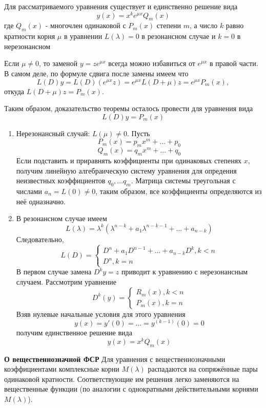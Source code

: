 \begin{theorem}
Для рассматриваемого уравнения существует и единственно решение вида
\[y(x) = x^k e^{\mu x} Q_m(x) \]
где $ Q_m(x)$ - многочлен одинаковой с $P_m(x)$ степени $m$, а число $k$ равно кратности корня $\mu$ в уравнении $L(\lambda)=0$ в резонансном случае и $k=0$ в нерезонансном
\end{theorem}

\Proof
Если $\mu \neq 0$, то заменой $y = z e^{\mu x}$ всегда можно избавиться от $e^{\mu x}$ в правой части. В самом деле, по формуле сдвига после замены имеем что \[L(D) y = L(D)(e^{\mu x} z) = e^{\mu x} L(D+\mu) z = e^{\mu x}  P_m(x),\]
откуда $L(D+\mu)z=P_m(x)$.

Таким образом, доказательство теоремы осталось провести для уравнения вида
\[L(D)y=P_m(x)\]

\begin{enumerate}
    \item Нерезонансный случай: $L(\mu) \neq 0$. Пусть
    \[P_m(x) = p_m x^m + ... + p_0\]
    \[Q_m(x) = q_m x^m + ... + q_0\]
    Если подставить и приравнять коэффициенты при одинаковых степенях $x$, получим линейную алгебраическую систему уравнения для опредения неизвестных коэффициентов $q_0, ... q_m$. Матрица системы треугольная с числами $a_n = L(0) \neq 0$, таким образом, все коэффициенты определяются из неё одназначно.
    \item В резонансном случае имеем 
    \[L(\lambda) = \lambda^k (\lambda^{n-k} + a_1 \lambda^{n-k-1} + ...+a_{n-k}) \]
    Следовательно,
    \begin{equation*}
        L(D) = 
        \begin{cases}
           D^n + a_1 D^{n-1} + ... + a_{n-k} D^k, k < n\\
           D^n, k = n
        \end{cases}
    \end{equation*}
    В первом случае замена $D^k y = z$ приводит к уравнению с нерезонансным случаем. Рассмотрим уравнение
    \begin{equation*}
        D^k(y) = 
        \begin{cases}
           R_m(x), k < n\\
           P_m(x), k = n
        \end{cases}
    \end{equation*}
    Взяв нулевые начальные условия для этого уравнения
        \[y(x) = y'(0) = ... = y^{(k-1)} (0) = 0\]
        получим единственное решение вида 
    \[y(x) = x^k Q_m(x)\]
\end{enumerate}
\EndProof

\textbf{О вещественнозначной ФСР}
Для уравнения с вещественнозначными коэффициентами комплексные корни $M(\lambda)$ распадаются на сопряжённые пары одинаковой кратности. Соответствующие им решения легко
заменяются на вещественные функции (по аналогии с однократными действительными корнями $M(\lambda)$).

